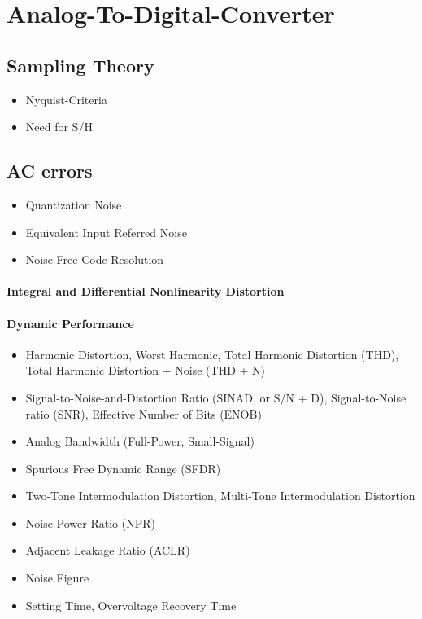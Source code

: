 \newpage
\section{Analog-To-Digital-Converter}
\subsection{Sampling Theory}
\begin{itemize}
\item Nyquist-Criteria
\item Need for S/H
\end{itemize}
\subsection{AC errors}
\begin{itemize}
\item Quantization Noise
\item Equivalent Input Referred Noise
\item Noise-Free Code Resolution
\end{itemize}
\paragraph{Integral and Differential Nonlinearity Distortion} 

\paragraph{Dynamic Performance}

\begin{itemize}
\item Harmonic Distortion, Worst Harmonic, Total Harmonic Distortion (THD), Total Harmonic Distortion + Noise (THD + N)
\item Signal-to-Noise-and-Distortion Ratio (SINAD, or S/N + D), Signal-to-Noise ratio (SNR), Effective Number of Bits (ENOB)
\item Analog Bandwidth (Full-Power, Small-Signal)
\item Spurious Free Dynamic Range (SFDR)
\item Two-Tone Intermodulation Distortion, Multi-Tone Intermodulation Distortion
\item Noise Power Ratio (NPR)
\item Adjacent Leakage Ratio (ACLR)
\item Noise Figure
\item Setting Time, Overvoltage Recovery Time
\end{itemize}

